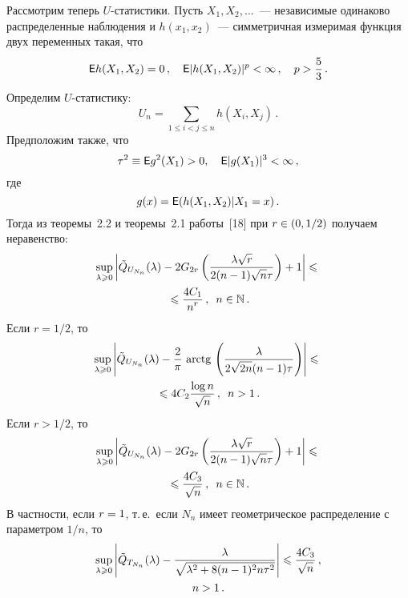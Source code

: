 \begin{multicols}{2}
Рассмотрим теперь $U$-статистики. Пусть $X_1,X_2,\ldots$~---
независимые одинаково распределенные наблюдения и $h(x_1,x_2)$~---
симметричная измеримая функция двух переменных такая, что
$$
{\sf E} h(X_1,X_2) = 0\,,\ \ \ {\sf E} |h(X_1,X_2)|^p <  \infty\,,\ \ \
p > \displaystyle\frac{\displaystyle 5\mathstrut}{\displaystyle 3\mathstrut}\,.
$$
Определим  $U$-статистику:
$$
U_n = \sum\limits_{1\leqslant  i<j\leqslant  n} h(X_i,X_j)\,.
$$
Предположим также, что
$$
\tau^2\equiv{\sf E}g^2(X_1)>0,\ \ \ {\sf E}|g(X_1)|^3<\infty\,,
$$
где
$$
g(x)={\sf E}(h(X_1,X_2)|X_1=x)\,.
$$
Тогда из теоремы~2.2 и теоремы~2.1 работы~[18] при $r\hm\in(0,1/2)$
получаем неравенство:
\begin{multline*}
\sup\limits_{\lambda\geqslant 0}\left\vert\tilde Q_{U_{N_n}}(\lambda)-
2G_{2r}\left(\displaystyle\frac{\displaystyle \lambda\sqrt{r}\mathstrut}{\displaystyle 2(n-1)\sqrt n\tau\mathstrut}\right)+1\right\vert
\leqslant {}\\
{}\leqslant \displaystyle\frac{\displaystyle 4C_1\mathstrut}{\displaystyle n^{r}\mathstrut}\,,\enskip 
n\in\mathbb N\,.
\end{multline*}
Если $r=1/2$, то
\begin{multline*}
\sup\limits_{\lambda\geqslant 0}\left\vert\tilde Q_{U_{N_n}}(\lambda)-
\displaystyle\frac{\displaystyle 2\mathstrut}{\displaystyle \pi\mathstrut}\,\,\mathrm{arctg}\,\left(\displaystyle\frac{\displaystyle \lambda\mathstrut}{\displaystyle 2\sqrt{2n}(n-1)\tau\mathstrut}\right)\right\vert
\leqslant{}\\
{}\leqslant 4C_2\displaystyle\frac{\displaystyle \log n\mathstrut}{\displaystyle \sqrt{n}\mathstrut}\,,\enskip n>1\,.
\end{multline*}
Если $r>1/2$, то
\begin{multline*}
\sup\limits_{\lambda\geqslant 0}\left\vert\tilde Q_{U_{N_n}}(\lambda)-
2G_{2r}\left(\displaystyle\frac{\displaystyle \lambda\sqrt{r}\mathstrut}{\displaystyle 2(n-1)\sqrt n\tau\mathstrut}\right)+1\right\vert
\leqslant{}\\
{}\leqslant \displaystyle\frac{\displaystyle 4C_3\mathstrut}{\displaystyle \sqrt{n}\mathstrut}\,,\enskip n\in\mathbb N\,.
\end{multline*}
В частности, если $r\hm=1$, т.\,е.\ если $N_n$ имеет гео\-мет\-ри\-че\-ское
распределение с параметром $1/n$, то
\begin{multline*}
\sup\limits_{\lambda\geqslant 0}\left\vert\tilde Q_{T_{N_n}}(\lambda)-
\displaystyle\frac{\displaystyle \lambda\mathstrut}{\displaystyle \sqrt{\lambda^2+8(n-1)^2n\tau^2}\mathstrut}\right\vert\leqslant
\displaystyle\frac{\displaystyle 4C_3\mathstrut}{\displaystyle \sqrt{n}\mathstrut}\,,\\  n>1\,.
\end{multline*}


\end{multicols}
